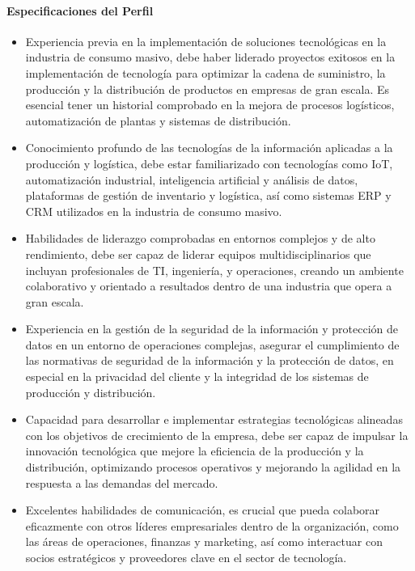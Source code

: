         \paragraph*{Especificaciones del Perfil }
        \begin{itemize}
            \item Experiencia previa en la implementación de soluciones tecnológicas en la industria de consumo masivo, debe haber liderado proyectos exitosos en la implementación de tecnología para optimizar la cadena de suministro, la producción y la distribución de productos en empresas de gran escala. Es esencial tener un historial comprobado en la mejora de procesos logísticos, automatización de plantas y sistemas de distribución. 
            \item Conocimiento profundo de las tecnologías de la información aplicadas a la producción y logística, debe estar familiarizado con tecnologías como IoT, automatización industrial, inteligencia artificial y análisis de datos, plataformas de gestión de inventario y logística, así como sistemas ERP y CRM utilizados en la industria de consumo masivo. 
            \item Habilidades de liderazgo comprobadas en entornos complejos y de alto rendimiento, debe ser capaz de liderar equipos multidisciplinarios que incluyan profesionales de TI, ingeniería, y operaciones, creando un ambiente colaborativo y orientado a resultados dentro de una industria que opera a gran escala. 
            \item Experiencia en la gestión de la seguridad de la información y protección de datos en un entorno de operaciones complejas, asegurar el cumplimiento de las normativas de seguridad de la información y la protección de datos, en especial en la privacidad del cliente y la integridad de los sistemas de producción y distribución. 
            \item Capacidad para desarrollar e implementar estrategias tecnológicas alineadas con los objetivos de crecimiento de la empresa, debe ser capaz de impulsar la innovación tecnológica que mejore la eficiencia de la producción y la distribución, optimizando procesos operativos y mejorando la agilidad en la respuesta a las demandas del mercado. 
            \item Excelentes habilidades de comunicación, es crucial que pueda colaborar eficazmente con otros líderes empresariales dentro de la organización, como las áreas de operaciones, finanzas y marketing, así como interactuar con socios estratégicos y proveedores clave en el sector de tecnología. 

\end{itemize}
